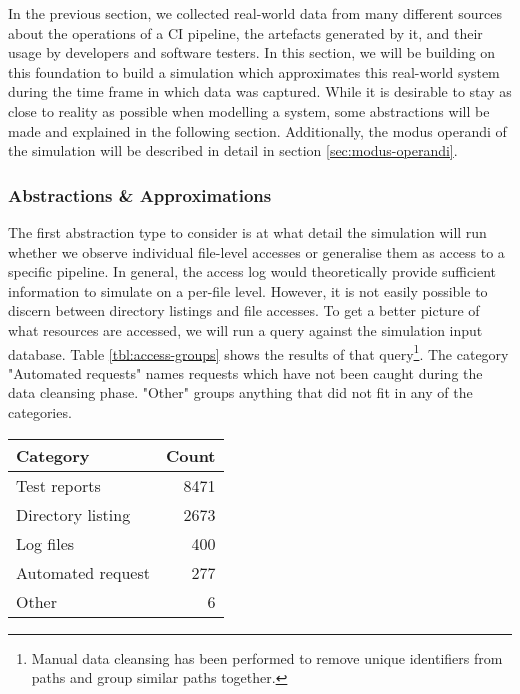 In the previous section, we collected real-world data from many different sources about the operations of a CI pipeline, the artefacts generated by it, and their usage by developers and software testers. In this section, we will be building on this foundation to build a simulation which approximates this real-world system during the time frame in which data was captured. While it is desirable to stay as close to reality as possible when modelling a system, some abstractions will be made and explained in the following section. Additionally, the modus operandi of the simulation will be described in detail in section \ref{sec:modus-operandi}.

\subsubsection{Abstractions \& Approximations}\label{sec:abstractions}
    The first abstraction type to consider is at what detail the simulation will run whether we observe individual file-level accesses or generalise them as access to a specific pipeline. In general, the access log would theoretically provide sufficient information to simulate on a per-file level. However, it is not easily possible to discern between directory listings and file accesses. To get a better picture of what resources are accessed, we will run a query against the simulation input database. Table \ref{tbl:access-groups} shows the results of that query\footnote{Manual data cleansing has been performed to remove unique identifiers from paths and group similar paths together.}. The category "Automated requests" names requests which have not been caught during the data cleansing phase. "Other" groups anything that did not fit in any of the categories.

    \begin{Figure}
        \begin{center}
            \begin{tabular}{ l | r }
                Category & Count \\ \hline
                Test reports & 8471 \\
                Directory listing & 2673 \\ 
                Log files & 400 \\ 
                Automated request & 277 \\
                Other & 6
            \end{tabular}
        \end{center}
        \label{tbl:access-groups}
    \end{Figure}
    
